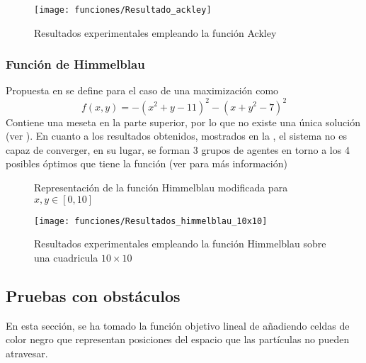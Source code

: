 \begin{figure}[htbp]
    \centering
    \texttt{[image: funciones/Resultado\_ackley]}
    \caption{Resultados experimentales empleando la función Ackley}
    \label{fig:3}
\end{figure}

\subsubsection{Función de Himmelblau} Propuesta en \cite{HimmelblauFunction} se define para el caso de una maximización como
\[  f(x,y)=-(x^2 + y - 11)^2 - (x + y^2 - 7)^2  \]
Contiene una meseta en la parte superior, por lo que no existe una única solución (ver ).
En cuanto a los resultados obtenidos, mostrados en la , el sistema no es capaz de converger, en su lugar, se forman 3 grupos de agentes en torno a los 4 posibles óptimos que tiene la función (ver \cite{WebFuncionesOptimizacion} para más información)


\begin{figure}[htbp]
    \centering
    \caption{Representación de la función Himmelblau modificada para $x,y\in[0,10]$}
    \label{fig:4}
\end{figure}

\begin{figure}[htbp]
    \centering
    \texttt{[image: funciones/Resultados\_himmelblau\_10x10]}
    \caption{Resultados experimentales empleando la función Himmelblau sobre una cuadricula $10\times10$}
    \label{fig:5}
\end{figure}

\subsection{Pruebas con obstáculos}

En esta sección, se ha tomado la función objetivo lineal de \cite{initialPaper} añadiendo celdas de color negro que representan posiciones del espacio que las partículas no pueden atravesar.


